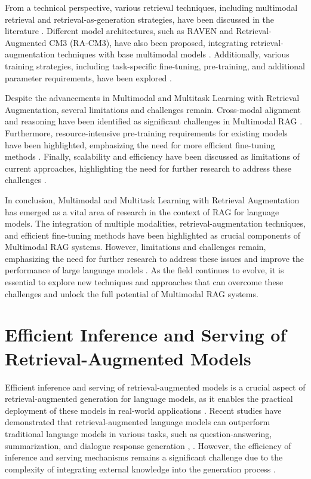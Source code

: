 \documentclass[conference]{IEEEtran}
\begin{document}
From a technical perspective, various retrieval techniques, including multimodal retrieval and retrieval-as-generation strategies, have been discussed in the literature \cite{b3}. Different model architectures, such as RAVEN and Retrieval-Augmented CM3 (RA-CM3), have also been proposed, integrating retrieval-augmentation techniques with base multimodal models \cite{b5}. Additionally, various training strategies, including task-specific fine-tuning, pre-training, and additional parameter requirements, have been explored \cite{b6}.

Despite the advancements in Multimodal and Multitask Learning with Retrieval Augmentation, several limitations and challenges remain. Cross-modal alignment and reasoning have been identified as significant challenges in Multimodal RAG \cite{b2}. Furthermore, resource-intensive pre-training requirements for existing models have been highlighted, emphasizing the need for more efficient fine-tuning methods \cite{b5}. Finally, scalability and efficiency have been discussed as limitations of current approaches, highlighting the need for further research to address these challenges \cite{b6}.

In conclusion, Multimodal and Multitask Learning with Retrieval Augmentation has emerged as a vital area of research in the context of RAG for language models. The integration of multiple modalities, retrieval-augmentation techniques, and efficient fine-tuning methods have been highlighted as crucial components of Multimodal RAG systems. However, limitations and challenges remain, emphasizing the need for further research to address these issues and improve the performance of large language models \cite{b1}. As the field continues to evolve, it is essential to explore new techniques and approaches that can overcome these challenges and unlock the full potential of Multimodal RAG systems.

\section{Efficient Inference and Serving of Retrieval-Augmented Models}
Efficient inference and serving of retrieval-augmented models is a crucial aspect of retrieval-augmented generation for language models, as it enables the practical deployment of these models in real-world applications \cite{b1}. Recent studies have demonstrated that retrieval-augmented language models can outperform traditional language models in various tasks, such as question-answering, summarization, and dialogue response generation \cite{b2}, \cite{b3}. However, the efficiency of inference and serving mechanisms remains a significant challenge due to the complexity of integrating external knowledge into the generation process \cite{b4}.
\end{document}
